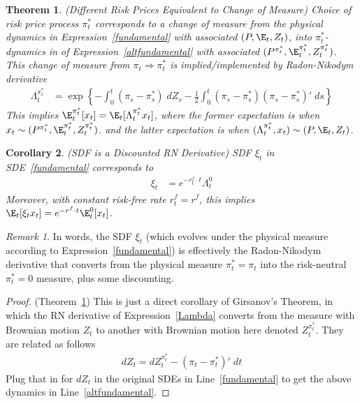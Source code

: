 \documentclass[12pt]{article}
\theoremstyle{plain}
\newtheorem{thm}{Theorem}[section]
\newtheorem{cor}[thm]{Corollary}
\theoremstyle{definition}
\theoremstyle{remark}
\newtheorem*{rmk}{Remark}
\begin{document}
\begin{thm}
\emph{(Different Risk Prices Equivalent to Change of Measure)}
\label{thm:chgmeasure}
Choice of risk price process $\pi_t^*$ corresponds to a change of
measure from the physical dynamics in
Expression~\ref{fundamental} with associated $(P,\E_t,Z_t)$,
\emph{into} $\pi_t^*$-dynamics in of Expression~\ref{altfundamental}
with associated $(P^{\pi_t^*},\E_t^{\pi_t^*},Z_t^{\pi_t^*})$.
This change of measure from $\pi_t\Rightarrow\pi_t^*$ is
implied/implemented by Radon-Nikodym derivative
\begin{align}
  \Lambda_t^{\pi_t^*}
  &=
  \exp\left\{
    -\int_0^t (\pi_s-\pi_s^*)\;dZ_s
    -
    \frac{1}{2}
    \int_0^t (\pi_s-\pi_s^*)(\pi_s-\pi_s^*)'\;ds
  \right\}
  \label{Lambda}
\end{align}
This implies $\E_t^{\pi_t^*}[x_t] = \E_t[\Lambda_t^{\pi_t^*} x_t]$,
where the former expectation is when
$x_t\sim (P^{\pi_t^*},\E_t^{\pi_t^*},Z_t^{\pi_t^*})$.
and the latter expectation is when
$(\Lambda_t^{\pi_t^*},x_t)\sim (P,\E_t,Z_t)$.
\end{thm}


\begin{cor}
\emph{(SDF is a Discounted RN Derivative)}
\label{cor:sdfrn}
SDF $\xi_t$ in SDE~\ref{fundamental} corresponds to
\begin{align*}
  \xi_t&=e^{-r_t^f\cdot t}\Lambda_t^{0}
\end{align*}
Moreover, with constant risk-free rate $r_t^f=r^f$, this implies
$\E_t[\xi_tx_t] =e^{-r^f\cdot t}\E_t^{0}[x_t]$.

\end{cor}
\begin{rmk}
In words, the SDF $\xi_t$ (which evolves under the physical measure
according to Expression~\ref{fundamental}) is effectively the
Radon-Nikodym derivative that converts from the physical measure
$\pi_t^*=\pi_t$ into the risk-neutral $\pi_t^*=0$ measure, plus some
discounting.
\end{rmk}

\begin{proof}
(Theorem~\ref{thm:chgmeasure})
This is just a direct corollary of Girsanov's Theorem, in which the RN
derivative of Expression~\ref{Lambda} converts from the measure with
Brownian motion $Z_t$ to another with Brownian motion here denoted
$Z_t^{\pi_t^*}$. They are related as follows
\begin{align*}
  dZ_t = dZ_t^{\pi_t^*} - (\pi_t-\pi_t^*)'\;dt
\end{align*}
Plug that in for $dZ_t$ in the original SDEs in
Line~\ref{fundamental} to get the above dynamics in
Line~\ref{altfundamental}.
\end{proof}
\end{document}

